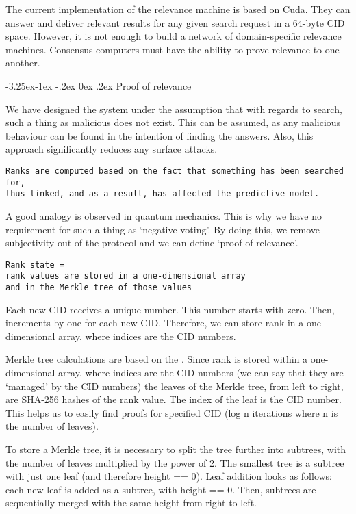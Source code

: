 \documentclass[8pt,oneside]{amsart}
\makeatletter
\newcommand{\linkgreen}[2]{\href{#1}{\color{green}{#2}}}
\renewcommand\subsection{\@startsection{subsection}{2}{\z@}%
                                     {-3.25ex\@plus -1ex \@minus -.2ex}%
                                     {0ex \@plus .2ex}%
                                     {\play\Large}}%
\newcommand{\titleSection}[1]{\subsection{#1}}
\newcommand{\code}[1]{{\PlayBold #1}}
\makeatother
\begin{document}
\begin{Abstract}
The current implementation of the relevance machine is based on Cuda. They can answer and deliver relevant results for any given search request in a 64-byte CID space. However, it is not enough to build a network of domain-specific relevance machines. Consensus computers must have the ability to prove relevance to one another.

\titleSection{Proof of relevance}\label{Proof of relevance}

We have designed the system under the assumption that with regards to search, such a thing as malicious does not exist. This can be assumed, as any malicious behaviour can be found in the intention of finding the answers. Also, this approach significantly reduces any surface attacks.

\begin{lstlisting}
Ranks are computed based on the fact that something has been searched for,
thus linked, and as a result, has affected the predictive model.
\end{lstlisting}

A good analogy is observed in quantum mechanics. This is why we have no requirement for such a thing as ‘negative voting’. By doing this, we remove subjectivity out of the protocol and we can define ‘proof of relevance’.

\begin{lstlisting}
Rank state =
rank values are stored in a one-dimensional array
and in the Merkle tree of those values
\end{lstlisting}

Each new CID receives a unique number. This number starts with zero. Then, increments by one for each new CID. Therefore, we can store rank in a one-dimensional array, where indices are the CID numbers.

Merkle tree calculations are based on the \linkgreen{https://tools.ietf.org/html/rfc6962#section-2.1}{RFC-6962 standard}. Since rank is stored within a one-dimensional array, where indices are the CID numbers (we can say that they are ‘managed’ by the CID numbers) the leaves of the Merkle tree, from left to right, are \code{SHA-256} hashes of the rank value. The index of the leaf is the CID number. This helps us to easily find proofs for specified CID (\code{log n} iterations where \code{n} is the number of leaves).

To store a Merkle tree, it is necessary to split the tree further into subtrees, with the number of leaves multiplied by the power of 2. The smallest tree is a subtree with just one leaf (and therefore \code{height == 0}). Leaf addition looks as follows: each new leaf is added as a subtree, with \code{height == 0}. Then, subtrees are sequentially merged with the same \code{height} from right to left.


\end{Abstract}
\end{document}
